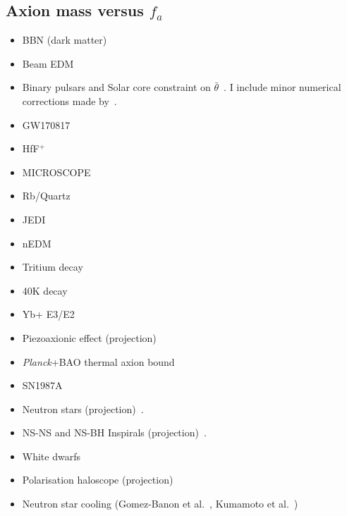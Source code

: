 \documentclass[8pt,twocolumn]{extarticle}
\begin{document}
\begin{mdframed}
\vspace{-1em}
\section{Axion mass versus $f_a$}\vspace{-0.5em}
\begin{itemize}\setlength\itemsep{-0.5em}
	\item BBN (dark matter)~\cite{Blum:2014vsa}
	\item Beam EDM~\cite{Schulthess:2022pbp}
	\item Binary pulsars and Solar core constraint on $\bar{\theta}$~\cite{Hook:2017psm}. I include minor numerical corrections made by~\cite{DiLuzio:2021gos,DiLuzio:2021pxd}.
	\item GW170817~\cite{Zhang:2021mks}
	\item HfF$^+$~\cite{Roussy:2020ily}
	\item MICROSCOPE~\cite{Gue:2025nxq}
		\item Rb/Quartz~\cite{Zhang:2022ewz}
		\item JEDI~\cite{JEDI:2022hxa}
	\item nEDM~\cite{Abel:2017rtm}
	\item Tritium decay~\cite{Zhang:2023lem}
	\item 40K decay~\cite{Alda:2024xxa}
	\item Yb+ E3/E2~\cite{Banerjee:2023bjc}
	\item Piezoaxionic effect (projection)~\cite{Arvanitaki:2021wjk}
		\item \emph{Planck}+BAO thermal axion bound~\cite{Caloni:2022uya}
	\item SN1987A~\cite{Lucente:2022vuo,Springmann:2024ret}
	\item Neutron stars (projection)~\cite{Hook:2017psm}.
	\item NS-NS and NS-BH Inspirals (projection)~\cite{Hook:2017psm}.
	\item White dwarfs~\cite{Balkin:2022qer}
	\item Polarisation haloscope (projection)~\cite{Berlin:2022mia}
	\item Neutron star cooling (Gomez-Banon et al.~\cite{Gomez-Banon:2024oux}, Kumamoto et al.~\cite{Kumamoto:2024wjd})

\end{itemize}


\end{mdframed}
\end{document}

